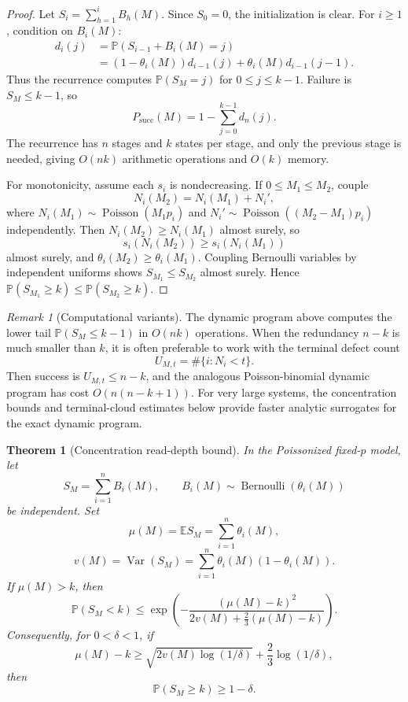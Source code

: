 \documentclass[11pt]{article}
\newtheorem{theorem}{Theorem}
\theoremstyle{definition}
\theoremstyle{remark}
\newtheorem{remark}{Remark}
\DeclareMathOperator{\Poisson}{Poisson}
\DeclareMathOperator{\Bernoulli}{Bernoulli}
\DeclareMathOperator{\Var}{Var}
\newcommand{\E}{\mathbb E}
\newcommand{\Pbb}{\mathbb P}
\newcommand{\1}{\mathbf 1}
\begin{document}
\begin{proof}
Let \(S_i=\sum_{h=1}^iB_h(M)\).  Since \(S_0=0\), the initialization is clear.  For \(i\ge1\), condition on \(B_i(M)\):
\[
\begin{aligned}
  d_i(j)&=\Pbb(S_{i-1}+B_i(M)=j) \\
  &=(1-\theta_i(M))d_{i-1}(j)+\theta_i(M)d_{i-1}(j-1).
\end{aligned}
\]
Thus the recurrence computes \(\Pbb(S_M=j)\) for \(0\le j\le k-1\).  Failure is \(S_M\le k-1\), so
\[
  P_{\mathrm{succ}}(M)=1-\sum_{j=0}^{k-1}d_n(j).
\]
The recurrence has \(n\) stages and \(k\) states per stage, and only the previous stage is needed, giving \(O(nk)\) arithmetic operations and \(O(k)\) memory.

For monotonicity, assume each \(s_i\) is nondecreasing.  If \(0\le M_1\le M_2\), couple
\[
  N_i(M_2)=N_i(M_1)+N_i',
\]
where \(N_i(M_1)\sim\Poisson(M_1p_i)\) and \(N_i'\sim\Poisson((M_2-M_1)p_i)\) independently.  Then \(N_i(M_2)\ge N_i(M_1)\) almost surely, so
\[
  s_i(N_i(M_2))\ge s_i(N_i(M_1))
\]
almost surely, and \(\theta_i(M_2)\ge\theta_i(M_1)\).  Coupling Bernoulli variables by independent uniforms shows \(S_{M_1}\le S_{M_2}\) almost surely.  Hence \(\Pbb(S_{M_1}\ge k)\le\Pbb(S_{M_2}\ge k)\).
\end{proof}

\begin{remark}[Computational variants]
The dynamic program above computes the lower tail \(\Pbb(S_M\le k-1)\) in \(O(nk)\) operations.  When the redundancy \(n-k\) is much smaller than \(k\), it is often preferable to work with the terminal defect count
\[
  U_{M,t}=\#\{i:N_i<t\}.
\]
Then success is \(U_{M,t}\le n-k\), and the analogous Poisson-binomial dynamic program has cost \(O(n(n-k+1))\).  For very large systems, the concentration bounds and terminal-cloud estimates below provide faster analytic surrogates for the exact dynamic program.
\end{remark}

\begin{theorem}[Concentration read-depth bound]\label{thm:concentration}
In the Poissonized fixed-\(p\) model, let
\[
  S_M=\sum_{i=1}^nB_i(M),
  \qquad B_i(M)\sim\Bernoulli(\theta_i(M))
\]
be independent.  Set
\[
  \mu(M)=\E S_M=\sum_{i=1}^n\theta_i(M),
\]
\[
  v(M)=\Var(S_M)=\sum_{i=1}^n\theta_i(M)(1-\theta_i(M)).
\]
If \(\mu(M)>k\), then
\[
  \Pbb(S_M<k)
  \le
  \exp\left(
  -\frac{(\mu(M)-k)^2}{2v(M)+\frac23(\mu(M)-k)}
  \right).
\]
Consequently, for \(0<\delta<1\), if
\[
  \mu(M)-k
  \ge
  \sqrt{2v(M)\log(1/\delta)}+\frac23\log(1/\delta),
\]
then
\[
  \Pbb(S_M\ge k)\ge1-\delta.
\]
\end{theorem}
\end{document}
